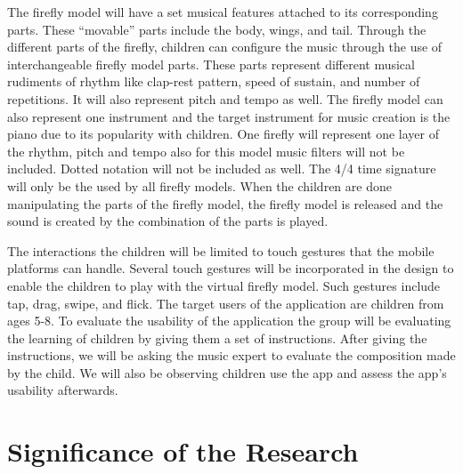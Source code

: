     The firefly model will have a set musical features attached to its corresponding parts. These “movable” parts include the body, wings, and tail. Through the different parts of the firefly, children can configure the music through the use of interchangeable firefly model parts. These parts represent different musical rudiments of rhythm like clap-rest pattern, speed of sustain, and number of repetitions. It will also represent pitch and tempo as well. The firefly model can also represent one instrument and the target instrument for music creation is the piano due to its popularity with children. One firefly will represent one layer of the rhythm, pitch and tempo also for this model music filters will not be included. Dotted notation will not be included as well. The 4/4 time signature will only be the used by all firefly models. When the children are done manipulating the parts of the firefly model, the firefly model is released and the sound is created by the combination of the parts is played.
    
    The interactions the children will be limited to touch gestures that the mobile platforms can handle. Several touch gestures will be incorporated in the design to enable the children to play with the virtual firefly model. Such gestures include tap, drag, swipe, and flick. The target users of the application are children from ages 5-8. To evaluate the usability of the application the group will be evaluating the learning of children by giving them a set of instructions. After giving the instructions, we will be asking the music expert to evaluate the composition made by the child. We will also be observing children use the app and assess the app’s usability afterwards.

\begin{comment}

%
%
Generally, one paragraph should be allotted for each of your research objectives.

Each paragraph contains a brief overview of the concept/theory and the purpose of doing the associated objective.

Each paragraph also includes a description of the scope/limitation of your study.

* Please refer to the slides for examples.

\end{comment}
    

\section{Significance of the Research}
\label{sec:significance}

